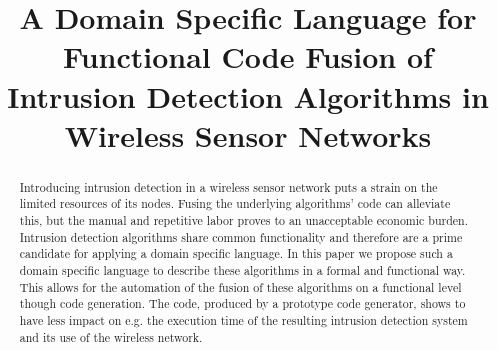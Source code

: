 \documentclass[conference]{IEEEtran}
\begin{document}
\expandafter\def\csname PY@tok@err\endcsname{}

\title{A Domain Specific Language for Functional Code Fusion of
       Intrusion Detection Algorithms in Wireless Sensor Networks}

\author{%
}

\maketitle

\begin{abstract}
  
Introducing intrusion detection in a wireless sensor network puts a strain on
the limited resources of its nodes. Fusing the underlying algorithms' code can
alleviate this, but the manual and repetitive labor proves to an unacceptable
economic burden. Intrusion detection algorithms share common functionality and
therefore are a prime candidate for applying a domain specific language. In
this paper we propose such a domain specific language to describe these
algorithms in a formal and functional way. This allows for the automation of
the fusion of these algorithms on a functional level though code generation.
The code, produced by a prototype code generator, shows to have less impact on
e.g. the execution time of the resulting intrusion detection system and its use
of the wireless network.

\end{abstract}



\end{document}
